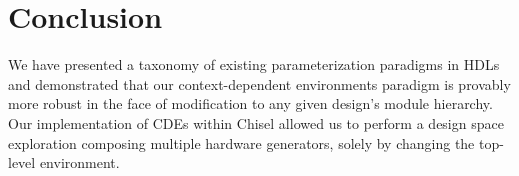 
\section{Conclusion}
\label{sec:con}

We have presented a taxonomy of existing parameterization paradigms in HDLs and demonstrated that our context-dependent environments paradigm is provably more robust in the face of modification to any given design's module hierarchy. Our implementation of CDEs within Chisel allowed us to perform a design space exploration composing multiple hardware generators, solely by changing the top-level environment.

